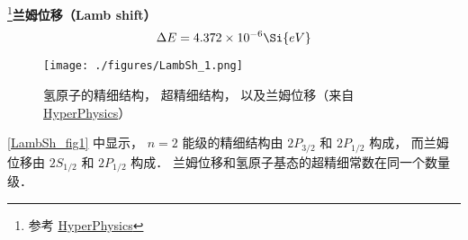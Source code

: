 
\footnote{参考 \href{http://hyperphysics.phy-astr.gsu.edu/hbase/quantum/lamb.html}{HyperPhysics}}\textbf{兰姆位移（Lamb shift）}
\begin{equation}
\Delta E = 4.372\times 10^{-6} \Si{eV}
\end{equation}

\begin{figure}[ht]
\centering
\texttt{[image: ./figures/LambSh\_1.png]}
\caption{氢原子的精细结构， 超精细结构， 以及兰姆位移（来自 \href{http://hyperphysics.phy-astr.gsu.edu/hbase/quantum/lamb.html}{HyperPhysics}）} \label{LambSh_fig1}
\end{figure}

\autoref{LambSh_fig1} 中显示， $n=2$ 能级的精细结构由 $2P_{3/2}$ 和 $2P_{1/2}$ 构成， 而兰姆位移由 $2S_{1/2}$ 和 $2P_{1/2}$ 构成． 兰姆位移和氢原子基态的超精细常数在同一个数量级．
